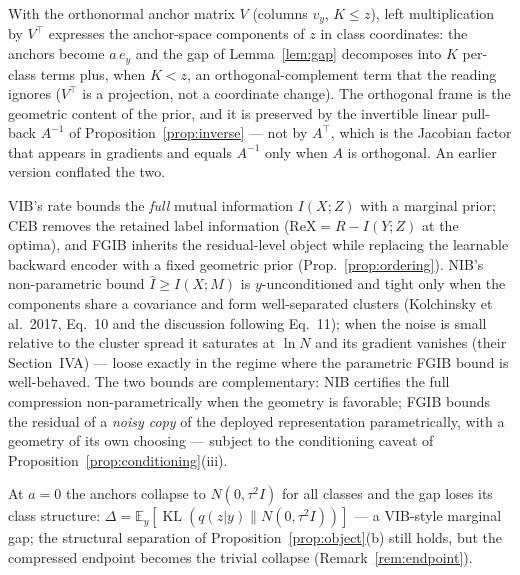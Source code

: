 \begin{remark}\label{rem:frame}
With the orthonormal anchor matrix $V$ (columns $v_y$, $K \le z$), left multiplication
by $V^{\top}$ expresses the anchor-space components of $z$ in class coordinates: the
anchors become $a\,e_y$ and the gap of Lemma~\ref{lem:gap} decomposes into $K$
per-class terms plus, when $K < z$, an orthogonal-complement term that the reading
ignores ($V^{\top}$ is a projection, not a coordinate change). The orthogonal frame is
the geometric content of the prior, and it is preserved by the invertible linear
pull-back $A^{-1}$ of Proposition~\ref{prop:inverse} --- not by $A^{\top}$, which is
the Jacobian factor that appears in gradients and equals $A^{-1}$ only when $A$ is
orthogonal. An earlier version conflated the two.
\end{remark}

\begin{remark}\label{rem:position}
VIB's rate bounds the \emph{full} mutual information $I(X;Z)$ with a marginal prior;
CEB removes the retained label information ($\mathrm{ReX} = R - I(Y;Z)$ at the optima),
and FGIB inherits the residual-level object while replacing the learnable backward
encoder with a fixed geometric prior (Prop.~\ref{prop:ordering}).
NIB's non-parametric bound $\widehat I \ge I(X;M)$ is $y$-unconditioned and tight only
when the components share a covariance and form well-separated clusters (Kolchinsky et
al.\ 2017, Eq.~10 and the discussion following Eq.~11); when the noise is small relative
to the cluster spread it saturates at $\ln N$ and its gradient vanishes (their
Section~IVA) --- loose exactly in the regime where the parametric FGIB bound is
well-behaved. The two bounds are complementary: NIB certifies the full compression
non-parametrically when the geometry is favorable; FGIB bounds the residual of a
\emph{noisy copy} of the deployed representation parametrically, with a geometry of its
own choosing --- subject to the conditioning caveat of
Proposition~\ref{prop:conditioning}(iii).
\end{remark}

\begin{remark}\label{rem:a0}
At $a = 0$ the anchors collapse to $N(0, \tau^2 I)$ for all classes and the gap loses its
class
structure: $\Delta = \mathbb{E}_y[\operatorname{KL}(q(z|y)\|N(0,\tau^2 I))]$ --- a
VIB-style
marginal gap; the structural separation of Proposition~\ref{prop:object}(b) still
holds, but the compressed endpoint becomes the trivial collapse
(Remark~\ref{rem:endpoint}).
\end{remark}

